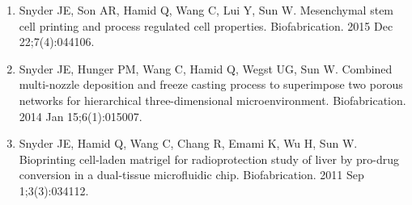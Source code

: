 \documentclass[11pt]{article}
\begin{document}
\begin{singlespace}
\begin{flushleft}
\begin{enumerate} [ leftmargin=*]
\item Snyder JE, Son AR, Hamid Q, Wang C, Lui Y, Sun W. Mesenchymal stem cell printing and process regulated cell properties. Biofabrication. 2015 Dec 22;7(4):044106. \href{https://doi.org/10.1088/1758-5090/7/4/044106}{\color{linkcolor}{https://doi.org/10.1088/1758-5090/7/4/044106}}




\item Snyder JE, Hunger PM, Wang C, Hamid Q, Wegst UG, Sun W. Combined multi-nozzle deposition and freeze casting process to superimpose two porous networks for hierarchical three-dimensional microenvironment. Biofabrication. 2014 Jan 15;6(1):015007. \href{https://doi.org/10.1115/ISFA2012-7105}{\color{linkcolor}{https://doi.org/10.1115/ISFA2012-7105}}

\item Snyder JE, Hamid Q, Wang C, Chang R, Emami K, Wu H, Sun W. Bioprinting cell-laden matrigel for radioprotection study of liver by pro-drug conversion in a dual-tissue microfluidic chip. Biofabrication. 2011 Sep 1;3(3):034112. \href{https://doi.org/10.1088/1758-5082/3/3/034112}{\color{linkcolor}{https://doi.org/10.1088/1758-5082/3/3/034112}}

\end{enumerate}



\end{flushleft}
\end{singlespace}
\end{document}
